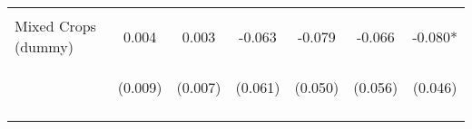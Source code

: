 \begin{center}
\begin{tabular}{lcccccc}
\vspace{4pt} & \begin{footnotesize}[0.030]\end{footnotesize} & \begin{footnotesize}[0.544]\end{footnotesize} & \begin{footnotesize}[0.046]\end{footnotesize} & \begin{footnotesize}[0.790]\end{footnotesize} & \begin{footnotesize}[0.043]\end{footnotesize} & \begin{footnotesize}[0.798]\end{footnotesize} \\
Mixed Crops (dummy) & 0.004 & 0.003 & -0.063 & -0.079 & -0.066 & -0.080* \\
 & \begin{footnotesize}(0.009)\end{footnotesize} & \begin{footnotesize}(0.007)\end{footnotesize} & \begin{footnotesize}(0.061)\end{footnotesize} & \begin{footnotesize}(0.050)\end{footnotesize} & \begin{footnotesize}(0.056)\end{footnotesize} & \begin{footnotesize}(0.046)\end{footnotesize} \\
\vspace{4pt} & \begin{footnotesize}[0.678]\end{footnotesize} & \begin{footnotesize}[0.718]\end{footnotesize} & \begin{footnotesize}[0.298]\end{footnotesize} & \begin{footnotesize}[0.119]\end{footnotesize} & \begin{footnotesize}[0.238]\end{footnotesize} & \begin{footnotesize}[0.082]\end{footnotesize} \\

\end{tabular}
\end{center}
